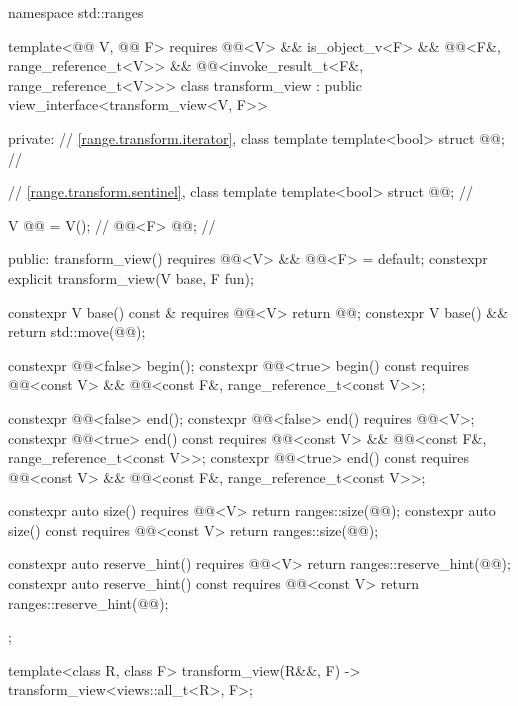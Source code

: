 %
%
%
\begin{codeblock}
namespace std::ranges {
  template<@@ V, @@ F>
    requires @@<V> && is_object_v<F> &&
             @@<F&, range_reference_t<V>> &&
             @@<invoke_result_t<F&, range_reference_t<V>>>
  class transform_view : public view_interface<transform_view<V, F>> {
  private:
    // \ref{range.transform.iterator}, class template 
    template<bool> struct @@;             // \expos

    // \ref{range.transform.sentinel}, class template 
    template<bool> struct @@;             // \expos

    V @@ = V();                              // \expos
    @@<F> @@;                        // \expos

  public:
    transform_view() requires @@<V> && @@<F> = default;
    constexpr explicit transform_view(V base, F fun);

    constexpr V base() const & requires @@<V> { return @@; }
    constexpr V base() && { return std::move(@@); }

    constexpr @@<false> begin();
    constexpr @@<true> begin() const
      requires @@<const V> &&
               @@<const F&, range_reference_t<const V>>;

    constexpr @@<false> end();
    constexpr @@<false> end() requires @@<V>;
    constexpr @@<true> end() const
      requires @@<const V> &&
               @@<const F&, range_reference_t<const V>>;
    constexpr @@<true> end() const
      requires @@<const V> &&
               @@<const F&, range_reference_t<const V>>;

    constexpr auto size() requires @@<V> { return ranges::size(@@); }
    constexpr auto size() const requires @@<const V>
    { return ranges::size(@@); }

    constexpr auto reserve_hint() requires @@<V>
    { return ranges::reserve_hint(@@); }
    constexpr auto reserve_hint() const requires @@<const V>
    { return ranges::reserve_hint(@@); }
  };

  template<class R, class F>
    transform_view(R&&, F) -> transform_view<views::all_t<R>, F>;
}
\end{codeblock}

